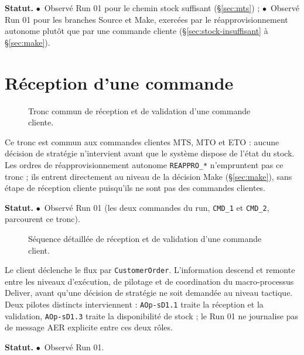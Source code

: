 \documentclass[11pt,a4paper]{article}
\newcommand{\code}[1]{\texttt{#1}}
\newcommand{\stRUN}{\ensuremath{\bullet}~Observé Run 01}
\newcommand{\statut}[1]{\textbf{Statut.} #1}
\begin{document}
\statut{\stRUN{} pour le chemin stock suffisant (\S\ref{sec:mts}) ; \stRUN{} pour les branches Source et Make, exercées par le réapprovisionnement autonome plutôt que par une commande cliente (\S\ref{sec:stock-insuffisant} à \S\ref{sec:make}).}

\section{Réception d'une commande}
\label{sec:reception}

\begin{figure}[H]
\centering

\caption{Tronc commun de réception et de validation d'une commande cliente.}
\label{fig:act02}
\end{figure}

Ce tronc est commun aux commandes clientes MTS, MTO et ETO : aucune décision de stratégie n'intervient avant que le système dispose de l'état du stock. Les ordres de réapprovisionnement autonome \code{REAPPRO\_*} n'empruntent pas ce tronc ; ils entrent directement au niveau de la décision Make (\S\ref{sec:make}), sans étape de réception cliente puisqu'ils ne sont pas des commandes clientes.

\statut{\stRUN{} (les deux commandes du run, \code{CMD\_1} et \code{CMD\_2}, parcourent ce tronc).}

\begin{landscape}
\begin{figure}[p]
\centering
\resizebox{\linewidth}{!}{}
\caption{Séquence détaillée de réception et de validation d'une commande client.}
\label{fig:seq01}
\end{figure}
\end{landscape}

Le client déclenche le flux par \code{CustomerOrder}. L'information descend et remonte entre les niveaux d'exécution, de pilotage et de coordination du macro-processus Deliver, avant qu'une décision de stratégie ne soit demandée au niveau tactique. Deux pilotes distincts interviennent : \code{AOp-sD1.1} traite la réception et la validation, \code{AOp-sD1.3} traite la disponibilité de stock ; le Run 01 ne journalise pas de message AER explicite entre ces deux rôles.

\statut{\stRUN.}
\end{document}
